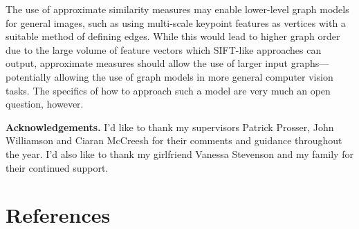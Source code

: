 \documentclass{mpaper}
\begin{document}
The use of approximate similarity measures may enable lower-level graph models for general images, such as using multi-scale keypoint features as vertices with a suitable method of defining edges.
While this would lead to higher graph order due to the large volume of feature vectors which SIFT-like approaches can output, approximate measures should allow the use of larger input graphs---potentially allowing the use of graph models in more general computer vision tasks.
The specifics of how to approach such a model are very much an open question, however.

\noindent
{\bf Acknowledgements.}
I'd like to thank my supervisors Patrick Prosser, John Williamson and Ciaran McCreesh for their comments and guidance throughout the year.
I'd also like to thank my girlfriend Vanessa Stevenson and my family for their continued support.

\section{References}
\renewcommand*{\bibfont}{\footnotesize}
\printbibliography[heading=none]

\vspace{1em}
\end{document}
